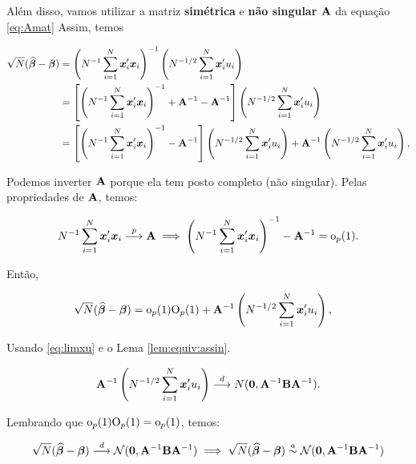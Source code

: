 \documentclass[11pt, oneside, a4paper, article]{article}
\numberwithin{equation}{section}
\begin{document}
\vspace{1 em}
Além disso, vamos utilizar a matriz \textbf{simétrica} e \textbf{não singular} $\mathbf{A}$ da equação \eqref{eq:Amat}
Assim, temos 

\vspace{-1 em}
\begin{align*}
\sqrt{N} (\widehat{\boldsymbol{\beta}} - \boldsymbol{\beta}) &=
\left( N^{-1} \sum_{i=1}^{N} \boldsymbol{x}_{i}' \boldsymbol{x}_{i} \right)^{-1}
\left( N^{-1/2} \sum_{i=1}^{N} \boldsymbol{x}_{i}' u_{i} \right)
\\ &=
\left[ 
\left( N^{-1} \sum_{i=1}^{N} \boldsymbol{x}_{i}' \boldsymbol{x}_{i} \right)^{-1} 
+ \mathbf{A}^{-1} - \mathbf{A}^{-1}
\right]
\left( N^{-1/2} \sum_{i=1}^{N} \boldsymbol{x}_{i}' u_{i} \right)
\\ &=
\left[ 
\left( N^{-1} \sum_{i=1}^{N} \boldsymbol{x}_{i}' \boldsymbol{x}_{i} \right)^{-1} 
- \mathbf{A}^{-1}
\right]
\left( N^{-1/2} \sum_{i=1}^{N} \boldsymbol{x}_{i}' u_{i} \right)
+ \mathbf{A}^{-1} 
\left( N^{-1/2} \sum_{i=1}^{N} \boldsymbol{x}_{i}' u_{i} \right),
\end{align*}

\noident
Podemos inverter $\mathbf{A}$ porque ela tem posto completo (não singular).
Pelas propriedades de $\mathbf{A}$, temos:

\vspace{-1 em}
\begin{align*}
N^{-1} \sum_{i=1}^{N} \boldsymbol{x}_{i}' \boldsymbol{x}_{i}  \overset{p}{\longrightarrow}  \mathbf{A}
\implies
\left( N^{-1} \sum_{i=1}^{N} \boldsymbol{x}_{i}' \boldsymbol{x}_{i} \right)^{-1}  - \mathbf{A}^{-1} = \text{o}_{p}(1).
\end{align*}

Então,

\vspace{-1 em}
\begin{align*}
\sqrt{N} (\widehat{\boldsymbol{\beta}} - \boldsymbol{\beta}) &=
\text{o}_{p}(1) \text{O}_{p}(1)
+ \mathbf{A}^{-1} \left( N^{-1/2} \sum_{i=1}^{N} \boldsymbol{x}_{i}' u_{i} \right),
\end{align*}

Usando \eqref{eq:limxu} e o Lema \ref{lem:equiv:assin}.

\begin{align*}
\mathbf{A}^{-1} \left( N^{-1/2} \sum_{i=1}^{N} \boldsymbol{x}_{i}' u_{i} \right)
 \overset{d}{\longrightarrow}  
N(\boldsymbol{0}, \mathbf{A}^{-1} \mathbf{B} \mathbf{A}^{-1}).
\end{align*}

Lembrando que $\text{o}_{p}(1) \text{O}_{p}(1) = \text{o}_{p}(1)$, temos:

\vspace{-1 em}
\begin{align*}
\sqrt{N} (\widehat{\boldsymbol{\beta}} - \boldsymbol{\beta})  \overset{d}{\longrightarrow}  \mathcal{N}(\boldsymbol{0}, \mathbf{A}^{-1} \mathbf{B} \mathbf{A}^{-1})
\implies
\sqrt{N} (\widehat{\boldsymbol{\beta}} - \boldsymbol{\beta}) \overset{a}{\sim} \mathcal{N}(\boldsymbol{0}, \mathbf{A}^{-1} \mathbf{B} \mathbf{A}^{-1})
\end{align*}
\end{document}
